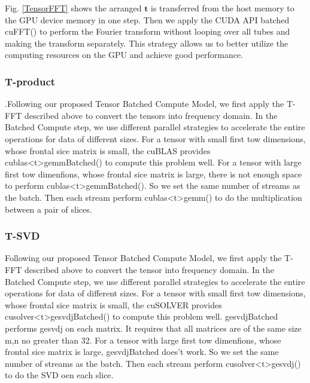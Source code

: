 \documentclass[format=acmsmall, review=false, screen=true]{acmart}
\begin{document}
Fig. \ref{TensorFFT} shows the arranged $\mathbf{t}$ is transferred from the host memory to the GPU device memory in one step. Then we apply the CUDA API batched cuFFT() to perform the Fourier transform without looping
over all tubes and making the transform separately. This strategy allows us to better utilize the computing resources on the GPU and achieve good performance.

\subsubsection{T-product}.Following our proposed Tensor Batched Compute Model, we first apply the T-FFT described above to convert the tensors into frequency domain. In the Batched Compute step, we use different parallel strategies to accelerate the entire operations for data of different sizes. For a tensor with small first tow dimensions, whose frontal sice matrix is small, the cuBLAS provides \textup{cublas<t>gemmBatched()} to compute this problem well. For a tensor with large first tow dimenfions, whose frontal sice matrix is large, there is not enough space to perform \textup{cublas<t>gemmBatched()}. So we set the same number of streams as the batch. Then each stream perform \textup{cublas<t>gemm()} to do the multiplication between a pair of slices.

\subsubsection{T-SVD}
Following our proposed Tensor Batched Compute Model, we first apply the T-FFT described above to convert the tensor into frequency domain. In the Batched Compute step, we use different parallel strategies to accelerate the entire operations for data of different sizes. For a tensor with small first tow dimensions, whose frontal sice matrix is small, the cuSOLVER provides \textup{cusolver<t>gesvdjBatched()} to compute this problem well. \textup{gesvdjBatched} performs gesvdj on each matrix. It requires that all matrices are of the same size m,n no greater than 32. For a tensor with large first tow dimenfions, whose frontal sice matrix is large, \textup{gesvdjBatched} does't work.  So we set the same number of streams as the batch. Then each stream perform \textup{cusolver<t>gesvdj()} to do the SVD oen each slice.
\end{document}
